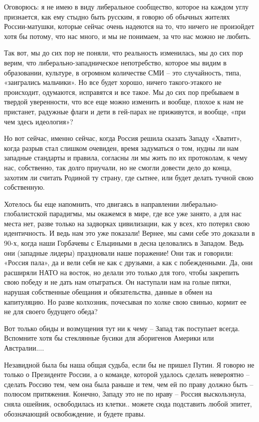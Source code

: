 Оговорюсь: я не имею в виду либеральное сообщество, которое на каждом углу
признается, как ему стыдно быть русским, я говорю об обычных жителях
России-матушки, которые сейчас очень надеются на то, что ничего не произойдет
хотя бы потому, что нас много, и мы не понимаем, за что нас можно не любить.

Так вот, мы до сих пор не поняли, что реальность изменилась, мы до сих пор
верим, что либерально-западническое непотребство, которое мы видим в
образовании, культуре, в огромном количестве СМИ – это случайность, типа,
«заигрались мальчики». Но все будет хорошо, ничего такого-этакого не
происходит, одумаются, исправятся и все такое. Мы до сих пор пребываем в
твердой уверенности, что все еще можно изменить и вообще, плохое к нам не
пристанет, радужные флаги и дети в гей-парах не приживутся, и вообще, «при чем
здесь идеология»?

Но вот сейчас, именно сейчас, когда Россия решила сказать Западу «Хватит»,
когда разрыв стал слишком очевиден, время задуматься о том, нудны ли нам
западные стандарты и правила, согласны ли мы жить по их протоколам, к чему нас,
собственно, так долго приучали, но не смогли довести дело до конца, захотим ли
считать Родиной ту страну, где сытнее, или будет делать тучной свою
собственную.

Хотелось бы еще напомнить, что двигаясь в направлении либерально-глобалистской
парадигмы, мы окажемся в мире, где все уже занято, а для нас места нет, разве
только на задворках цивилизации, как у всех, кто потерял свою идентичность. И
ведь нам это уже показали! Вернее, мы сами себе это доказали в 90-х, когда наши
Горбачевы с Ельциными в десна целовались в Западом. Ведь они (западные лидеры)
праздновали наше поражение! Они так и говорили: «Россия пала», да и вели себя
не как с друзьями, а как с побежденными. Да, они расширяли НАТО на восток, но
делали это только для того, чтобы закрепить свою победу и не дать нам
отыграться. Он наступали нам на голые пятки, нарушая собственные обещания и
обязательства, данные в обмен на капитуляцию. Но разве колхозник, почесывая по
холке свою свинью, кормит ее не для своего будущего обеда?

Вот только обиды и возмущения тут ни к чему – Запад так поступает всегда.
Вспомните хотя бы стеклянные бусики для аборигенов Америки или Австралии....

Незавидной была бы наша общая судьба, если бы не пришел Путин. Я говорю не
только о Президенте России, а о команде, которой удалось сделать невероятно –
сделать Россию тем, чем она была раньше и тем, чем ей по праву должно быть –
полюсом притяжения. Конечно, Западу это не по нраву – Россия выскользнула,
сняла ошейник, освободилась из клетки.. можете сюда подставить любой эпитет,
обозначающий освобождение, и будете правы.

